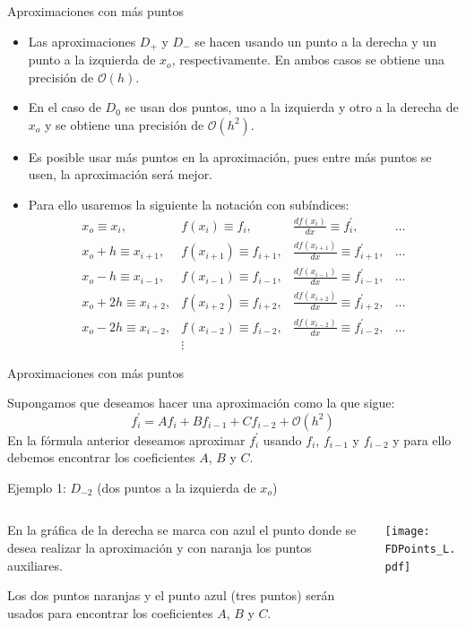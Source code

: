 \documentclass{beamer}
\begin{document}
\begin{frame}{Aproximaciones con más puntos}

\begin{itemize}
	\item Las aproximaciones $D_+$ y $D_-$ se hacen usando un punto a la derecha y un punto a la izquierda de $x_o$, respectivamente. En 
	ambos casos se obtiene una precisión de $\mathcal{O}(h)$.
	\item En el caso de $D_0$ se usan dos puntos, uno a la izquierda y otro a la derecha de $x_o$ y se obtiene una precisión de $\mathcal{O}(h^2)$.
	\item Es posible usar más puntos en la aproximación, pues entre más puntos se usen, la aproximación será mejor.
	\item Para ello usaremos la siguiente  la notación con subíndices:
{\small 
\[	
\begin{array}{cccccccccc}
x_o   \equiv  x_{i}, & f(x_{i}) \equiv f_{i}, & \frac{d f(x_{i})}{d x} \equiv f^\prime_{i}, & \dots \\
x_o+h \equiv  x_{i+1}, & f(x_{i+1}) \equiv f_{i+1}, & \frac{d f(x_{i+1})}{d x} \equiv f^\prime_{i+1}, & \dots \\
x_o-h \equiv  x_{i-1}, & f(x_{i-1}) \equiv f_{i-1}, & \frac{d f(x_{i-1})}{d x} \equiv f^\prime_{i-1}, & \dots \\
x_o+2h \equiv x_{i+2}, & f(x_{i+2}) \equiv f_{i+2}, & \frac{d f(x_{i+2})}{d x} \equiv f^\prime_{i+2}, & \dots \\
x_o-2h \equiv x_{i-2}, & f(x_{i-2}) \equiv f_{i-2}, & \frac{d f(x_{i-2})}{d x} \equiv f^\prime_{i-2}, & \dots \\
 & \vdots
\end{array}
\]
}
\end{itemize}
\end{frame}

\begin{frame}{Aproximaciones con más puntos}

Supongamos que deseamos hacer una aproximación como la que sigue:
% 
\[
f^\prime_i=A f_i + B f_{i-1}+C f_{i-2} + \mathcal{O}(h^2)
\]
%
En la fórmula anterior deseamos aproximar $f^\prime_i$ usando $f_i$, $f_{i-1}$ y $f_{i-2}$ y para ello debemos
encontrar los coeficientes $A$, $B$ y $C$.
{\footnotesize 
\begin{block}{Ejemplo 1: $D_{-2}$ (dos puntos a la izquierda de $x_o$)}
\begin{columns}[t]
\begin{column}{0.35\textwidth}
En la gráfica de la derecha se marca con azul el punto donde se desea realizar la aproximación
y con naranja los puntos auxiliares. 

\strut

Los dos puntos naranjas y el punto azul (tres puntos) serán usados para encontrar los coeficientes
$A$, $B$ y $C$.
\end{column}
\begin{column}[t]{0.6\textwidth}
\texttt{[image: FDPoints\_L.pdf]}
\end{column}
\end{columns}
\end{block}
}
\end{frame}
\end{document}
